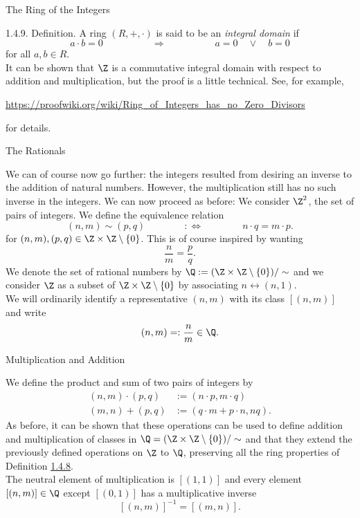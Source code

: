 \documentclass[smaller,hyperref={CJKbookmarks=true}]{beamer}
\begin{document}
\begin{frame}[c]{The Ring of the Integers}
\begin{spacing}{1.1}
\alert{1.4.9. Definition.} A ring $(R,+,\cdot)$ is said to be an \emph{integral domain} if
\[a\cdot b=0\qquad\qquad\quad
\Rightarrow\qquad\qquad\quad
a=0\quad\vee\quad b=0\]
for all $a,b\in R$.\\[5pt]
It can be shown that $\Z$ is a commutative integral domain with respect to addition and multiplication, but the proof is a little technical. See, for example,
\begin{center}
  \url{https://proofwiki.org/wiki/Ring_of_Integers_has_no_Zero_Divisors}
\end{center}
for details.
\end{spacing}
\end{frame}
\begin{frame}[t]{The Rationals}
\begin{spacing}{1}
We can of course now go further: the integers resulted from desiring an
inverse to the addition of natural numbers. However, the multiplication
still has no such inverse in the integers. We can now proceed as before:
We consider $\Z^2$, the set of pairs of integers. We define the equivalence relation
\begin{equation}\label{1.4.7}
(n,m)\sim(p,q)\qquad\qquad:\Leftrightarrow\qquad\qquad
n\cdot q=m\cdot p.
\end{equation}
for $(n,m),(p,q)\in\Z\times\Z\setminus\{0\}$. This is of course inspired by wanting
\[\frac{n}{m}=\frac{p}{q}.\]
We denote the set of rational numbers by $\Q:=(\Z\times\Z\setminus\{0\})/\sim$ and we consider $\Z$ as a subset of $\Z\times\Z\setminus\{0\}$ by associating $n\leftrightarrow(n,1)$.\\[5pt]
We will ordinarily identify a representative $(n,m)$ with its class $[(n,m)]$ and write
\[(n,m)=:\frac{n}{m}\in\Q.\]
\end{spacing}
\end{frame}
\begin{frame}[c]{Multiplication and Addition}
\begin{spacing}{1.1}
We define the product and sum of two pairs of integers by
\begin{align}\label{1.4.8}
  (n,m)\cdot(p,q) &:=(n\cdot p,m\cdot q) \\
  (m,n)+(p,q) &:=(q\cdot m+p\cdot n,nq).
\end{align}
As before, it can be shown that these operations can be used to define
addition and multiplication of classes in $\Q=(\Z\times\Z\setminus\{0\})/\sim$ and that they extend the previously defined operations on $\Z$ to $\Q$, preserving all the ring properties of Definition \hyperlink{1.4.8}{1.4.8}.\\[4pt]
The neutral element of multiplication is $[(1,1)]$ and every element $[(n,m)]\in\Q$ except $[(0,1)]$ has a multiplicative inverse
\[[(n,m)]^{-1}=[(m,n)].\]
\end{spacing}
\end{frame}
\end{document}
